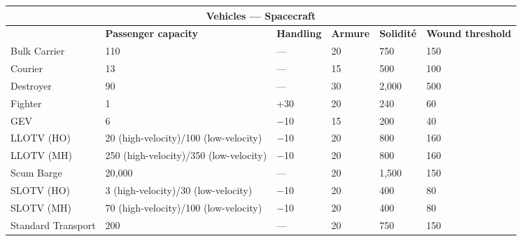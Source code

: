 \begin{table} \begin{tabularx}{\textwidth}{|l|X|l|X|l|l|} \hline

\multicolumn{6}{|c|}{\textbf{Vehicles --- Spacecraft}} \\ \hline

&\textbf{Passenger capacity}	&\textbf{Handling}	&\textbf{Armure}	&\textbf{Solidité}	&\textbf{Wound threshold}\\ \hline

Bulk Carrier	&110	&--- &20	&750	&150 \\ \hline

Courier	&13	&--- &15	&500	&100 \\ \hline

Destroyer	&90	&--- &30	&2,000	&500 \\ \hline

Fighter	&1	&+30	&20	&240	&60 \\ \hline

GEV	&6	&$-$10	&15	&200	&40 \\ \hline

LLOTV (HO)	&20	(high-velocity)/100 (low-velocity)	&$-$10	&20	&800	&160 \\ \hline

LLOTV (MH)	&250 (high-velocity)/350 (low-velocity)	&$-$10	&20	&800	&160 \\ \hline

Scum Barge	&20,000	&--- &20	&1,500	&150 \\ \hline

SLOTV (HO)	&3 (high-velocity)/30 (low-velocity)	&$-$10	&20	&400	&80 \\ \hline

SLOTV (MH)	&70	(high-velocity)/100 (low-velocity)	&$-$10	&20	&400	&80 \\ \hline

Standard Transport	&200	&--- &20	&750	&150 \\ \hline

\end{tabularx} \label{tab:spacecraft} \end{table} 



